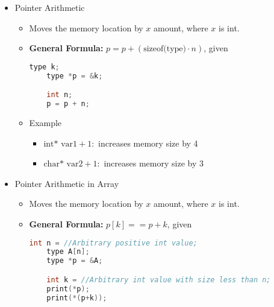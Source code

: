 \documentclass[12pt]{article}
\begin{document}
\begin{itemize}
    \item Pointer Arithmetic
    \begin{itemize}
        \item Moves the memory location by $x$ amount, where $x$ is int.
        \item \textbf{General Formula:} $p = p + (\text{sizeof(type)} \cdot n)$, given

    \begin{lstlisting}[language=c]
    type k;
    type *p = &k;

    int n;
    p = p + n;
    \end{lstlisting}

        \bigskip

        \item Example
        \begin{itemize}
            \item $\text{int* var1}+1:$ increases memory size by 4
            \item $\text{char* var2}+1:$ increases memory size by 3
        \end{itemize}
    \end{itemize}
    \item Pointer Arithmetic in Array
    \begin{itemize}
        \item Moves the memory location by $x$ amount, where $x$ is int.
        \item \textbf{General Formula:} $p[k] == p + k$, given

    \begin{lstlisting}[language=c]
    int n = //Arbitrary positive int value;
    type A[n];
    type *p = &A;

    int k = //Arbitrary int value with size less than n;
    print(*p);
    print(*(p+k));
    \end{lstlisting}

    \end{itemize}
\end{itemize}
\end{document}
